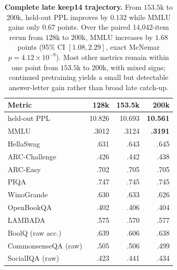 \begin{table}[t]
\centering
\small
\setlength{\tabcolsep}{4pt}
\begin{tabular}{@{}lrrr@{}}
\toprule
\textbf{Metric} & \textbf{128k} & \textbf{153.5k} & \textbf{200k} \\
\midrule
held-out PPL & 10.826 & 10.693 & \textbf{10.561} \\
MMLU & .3012 & .3124 & \textbf{.3191} \\
HellaSwag & .631 & .643 & .645 \\
ARC-Challenge & .426 & .442 & .438 \\
ARC-Easy & .702 & .705 & .705 \\
PIQA & .747 & .745 & .745 \\
WinoGrande & .630 & .633 & .626 \\
OpenBookQA & .402 & .406 & .404 \\
LAMBADA & .575 & .570 & .577 \\
BoolQ (raw acc.) & .639 & .606 & .638 \\
CommonsenseQA (raw) & .505 & .506 & .499 \\
SocialIQA (raw) & .423 & .441 & .434 \\
\bottomrule
\end{tabular}
\caption{\textbf{Complete late keep14 trajectory.}
From $153.5$k to $200$k, held-out PPL improves by $0.132$ while MMLU gains only
$0.67$ points. Over the paired 14,042-item rerun from $128$k to $200$k, MMLU
increases by $1.68$ points (95\% CI $[1.08,2.29]$, exact McNemar
$p=4.12\times10^{-8}$). Most other metrics remain within one point from
$153.5$k to $200$k, with mixed signs; continued pretraining yields a small but
detectable answer-letter gain rather than broad late catch-up.}
\label{tab:app-postapex}
\end{table}

